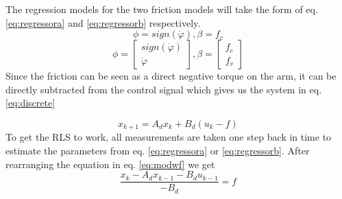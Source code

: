 \documentclass[10pt,a4paper]{article}
\begin{document}
The regression models for the two friction models will take the form of eq. \ref{eq:regressora} and \ref{eq:regressorb} respectively.
\begin{equation}
\phi=sign(\dot{\varphi}), \beta = f_c
\label{eq:regressora}
\end{equation}
\begin{equation}
\phi=\begin{bmatrix}
sign(\dot{\varphi}) \\
\dot{\varphi}
\end{bmatrix}, \beta = \begin{bmatrix}
f_c\\
f_v
\end{bmatrix}
\label{eq:regressorb}
\end{equation}
Since the friction can be seen as a direct negative torque on the arm, it can be directly subtracted from the control signal which gives us the system in eq. \ref{eq:discrete}

\begin{equation}
 x_{k+1} = A_dx_k + B_d(u_k - f)
\label{eq:modwf}
\end{equation}
To get the RLS to work, all measurements are taken one step back in time to estimate the parameters from eq. \ref{eq:regressora} or \ref{eq:regressorb}. After rearranging the equation in eq. \ref{eq:modwf} we get
\begin{equation}
 \dfrac{x_{k}-A_dx_{k-1}-B_d u_{k-1}}{-B_d} =   f
\label{eq:estim}
\end{equation}
\end{document}
